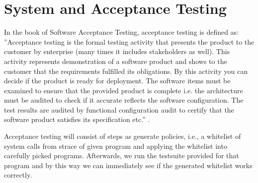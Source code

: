%
%
%
%


\section{System and Acceptance Testing}
\label{acceptance_testing}
In the book of Software Acceptance Testing, acceptance testing is defined as:
''Acceptance testing is the formal testing activity that presents the
product to the customer by enterprise (many times it includes stakeholders as
well). This activity represents demonstration of a software product and shows to
the customer that the requirements fulfilled its obligations. By this activity
you can decide if the product is ready for deployment. The software items must
be examined to ensure that the provided product is complete i.e. the
architecture must be audited to check if it accurate reflects the software
configuration. The test results are audited by functional configuration audit to
certify that the software product satisfies its specification etc.''
\cite{Schmidt2013335}.

Acceptance testing will consist of steps as generate policies, i.e., a whitelist
of system calls from strace of given program and applying the whitelist into
carefully picked programs. Afterwards, we run the testsuite provided for that
program and by this way we can immediately see if the generated whitelist works
correctly.

